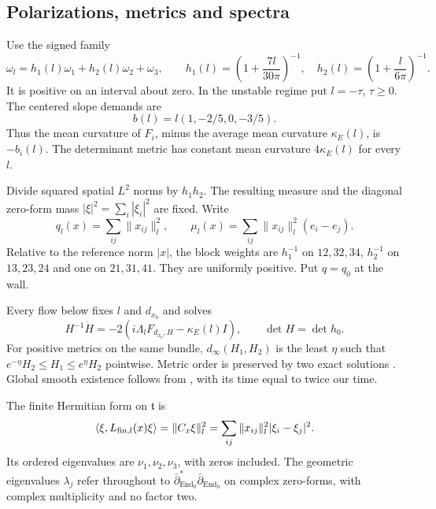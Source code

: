 \documentclass[11pt]{amsart}
\theoremstyle{definition}
\theoremstyle{remark}
\newcommand{\End}{\operatorname{End}}
\begin{document}
\subsection{Polarizations, metrics and spectra}
Use the signed family
\begin{equation}\label{eq:polarization}
 \omega_l=h_1(l)\omega_1+h_2(l)\omega_2+\omega_3,\qquad
 h_1(l)=\left(1+\frac{7l}{30\pi}\right)^{-1},\quad
 h_2(l)=\left(1+\frac{l}{6\pi}\right)^{-1}.
\end{equation}
It is positive on an interval about zero. In the unstable
regime put $l=-\tau$, $\tau\ge0$. The centered slope demands are
\begin{equation}\label{eq:demand}
 b(l)=l(1,-2/5,0,-3/5).
\end{equation}
Thus the mean curvature of $F_i$, minus the average mean
curvature $\kappa_E(l)$, is $-b_i(l)$. The determinant metric
has constant mean curvature $4\kappa_E(l)$ for every $l$.

Divide squared spatial $L^2$ norms by $h_1h_2$. The resulting
measure and the diagonal zero-form mass $|\xi|^2=\sum_i|\xi_i|^2$
are fixed. Write
\begin{equation}\label{eq:energy}
 q_l(x)=\sum_{ij}\|x_{ij}\|_l^2,\qquad
 \mu_l(x)=\sum_{ij}\|x_{ij}\|_l^2(e_i-e_j).
\end{equation}
Relative to the reference norm $|x|$, the block weights are
$h_1^{-1}$ on $12,32,34$, $h_2^{-1}$ on $13,23,24$ and one
on $21,31,41$. They are uniformly positive. Put $q=q_0$ at
the wall.

Every flow below fixes $l$ and $d_{x_b}$ and solves
\begin{equation}\label{eq:flow}
 H^{-1}\dot H=-2(i\Lambda_lF_{d_{x_b},H}-\kappa_E(l)I),
                       \qquad \det H=\det h_0 .
\end{equation}
For positive metrics on the same bundle, $d_\infty(H_1,H_2)$
is the least $\eta$ such that
$e^{-\eta}H_2\le H_1\le e^\eta H_2$ pointwise.
Metric order is preserved by two exact solutions
\cite[Proposition 4.3]{HKKP18}. Global smooth existence follows
from \cite[Theorem 6.8.25]{Kobayashi87}, with its time equal
to twice our time.

The finite Hermitian form on $\mathfrak t$ is
\begin{equation}\label{eq:finite-spectrum}
 \langle\xi,L_{{\rm fin},l}(x)\xi\rangle
        =\|C_x\xi\|_l^2
        =\sum_{ij}\|x_{ij}\|_l^2|\xi_i-\xi_j|^2 .
\end{equation}
Its ordered eigenvalues are $\nu_1,\nu_2,\nu_3$, with zeros
included. The geometric eigenvalues $\lambda_j$ refer throughout
to $\bar\partial_{\End_0}^*\bar\partial_{\End_0}$ on complex
zero-forms, with complex multiplicity and no factor two.
\end{document}
